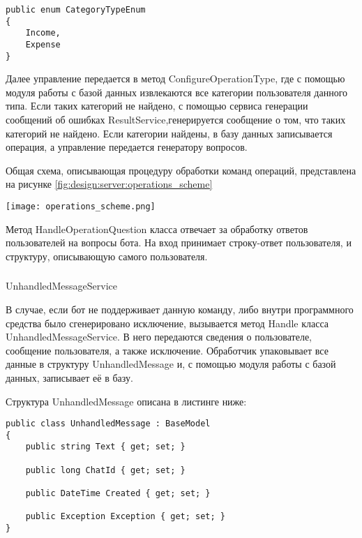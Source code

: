 \lstset{style=sharpc}
\begin{lstlisting}
public enum CategoryTypeEnum
{
	Income,
	Expense
}
\end{lstlisting}

Далее управление передается в метод ConfigureOperationType, где с помощью модуля работы с базой данных извлекаются все категории
пользователя данного типа. Если таких категорий не найдено, с помощью сервиса генерации сообщений об ошибках ResultService,генерируется сообщение о том, что таких категорий не найдено. Если категории найдены, в базу данных записывается операция, а управление передается генератору вопросов.

Общая схема, описывающая процедуру обработки команд операций, представлена на рисунке \ref{fig:design:server:operations_scheme}

\begin{sidewaysfigure}
\centering
	\texttt{[image: operations\_scheme.png]}
	\caption{Общая схема работы сервиса категорий}
	\label{fig:design:server:operations_scheme}
\end{sidewaysfigure}


\newpage

Метод HandleOperationQuestion класса отвечает за обработку ответов пользователей на вопросы бота. На вход принимает строку-ответ пользователя, и структуру, описывающую самого пользователя.

\subsubsection{} UnhandledMessageService
\label{sec:design:server:UnhandledMessageService}

В случае, если бот не поддерживает данную команду, либо внутри программного средства было сгенерировано исключение, вызывается метод Handle класса UnhandledMessageService. В него передаются сведения о пользователе, сообщение пользователя, а также исключение. Обработчик упаковывает все данные в структуру UnhandledMessage и, с помощью модуля работы с базой данных, записывает её в базу. 

\newpage

Структура UnhandledMessage описана в листинге ниже:

\lstset{style=sharpc}
\begin{lstlisting}
public class UnhandledMessage : BaseModel
{
	public string Text { get; set; }

	public long ChatId { get; set; }

	public DateTime Created { get; set; }

	public Exception Exception { get; set; }
}
\end{lstlisting}

